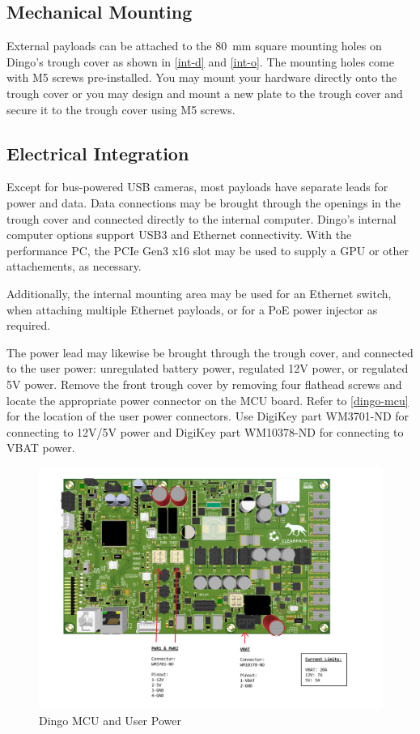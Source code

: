 \documentclass[]{clearpath-latex/clearpath-manual}
\begin{document}
\subsection{Mechanical Mounting}

External payloads can be attached to the \SI{80}{\mm} square mounting holes on Dingo's
trough cover as shown in \autoref{int-d} and \autoref{int-o}.
The mounting holes come with M5 screws pre-installed. You may mount your hardware directly
onto the trough cover or you may design and mount a new plate to the trough cover and
secure it to the trough cover using M5 screws.

\subsection{Electrical Integration}\label{payload-elec}

Except for bus-powered USB cameras, most payloads have separate leads for power and data. Data
connections may be brought through the openings in the trough cover and connected directly to
the internal computer.
Dingo's internal computer options support USB3 and Ethernet connectivity. With the performance
PC, the PCIe Gen3 x16 slot may be used to supply a GPU or other attachements, as necessary.

Additionally, the internal mounting area may be used for an Ethernet switch, when attaching multiple
Ethernet payloads, or for a PoE power injector as required.

The power lead may likewise be brought through the trough cover, and connected to the user power:
unregulated battery power, regulated 12V power, or regulated 5V power.
Remove the front trough cover by removing four flathead screws and locate the appropriate power
connector on the MCU board. Refer to \autoref{dingo-mcu} for the location of the user power connectors.
Use DigiKey part WM3701-ND for connecting to 12V/5V power and DigiKey part WM10378-ND for connecting to VBAT power.

\begin{figure}[H]
  \centering
  \includegraphics[width=0.9\linewidth]{dingo-mcu.png}
  \caption{Dingo MCU and User Power}
  \label{dingo-mcu}
\end{figure}
\end{document}
